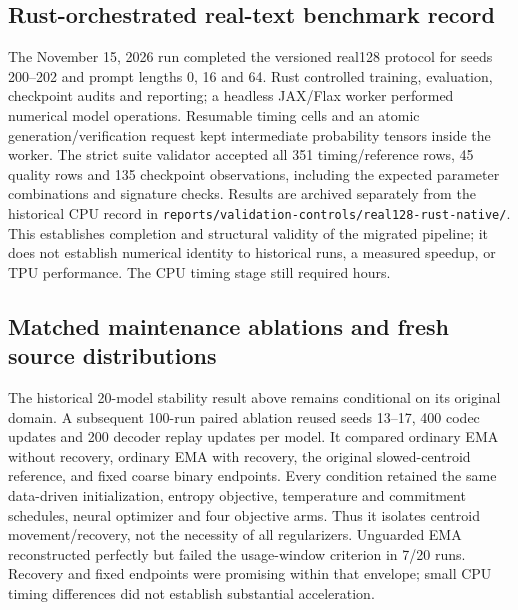 \subsection{Rust-orchestrated real-text benchmark record}
The November 15, 2026 run completed the versioned real128 protocol for seeds
200--202 and prompt lengths 0, 16 and 64. Rust controlled training, evaluation,
checkpoint audits and reporting; a headless JAX/Flax worker performed numerical
model operations. Resumable timing cells and an atomic generation/verification
request kept intermediate probability tensors inside the worker.
The strict suite validator accepted all 351 timing/reference rows, 45 quality
rows and 135 checkpoint observations, including the expected parameter
combinations and signature checks. Results are archived separately from the
historical CPU record in \texttt{reports/validation-controls/real128-rust-native/}.
This establishes completion and structural validity of the migrated pipeline;
it does not establish numerical identity to historical runs, a measured speedup,
or TPU performance. The CPU timing stage still required hours.

\subsection{Matched maintenance ablations and fresh source distributions}
The historical 20-model stability result above remains conditional on its
original domain. A subsequent 100-run paired ablation reused seeds 13--17,
400 codec updates and 200 decoder replay updates per model. It compared
ordinary EMA without recovery, ordinary EMA with recovery, the original
slowed-centroid reference, and fixed coarse binary endpoints. Every condition
retained the same data-driven initialization, entropy objective, temperature
and commitment schedules, neural optimizer and four objective arms. Thus it
isolates centroid movement/recovery, not the necessity of all regularizers.
\RecentMaintenanceTable
Unguarded EMA reconstructed perfectly but failed the usage-window criterion
in 7/20 runs. Recovery and fixed endpoints were promising within that envelope;
small CPU timing differences did not establish substantial acceleration.

